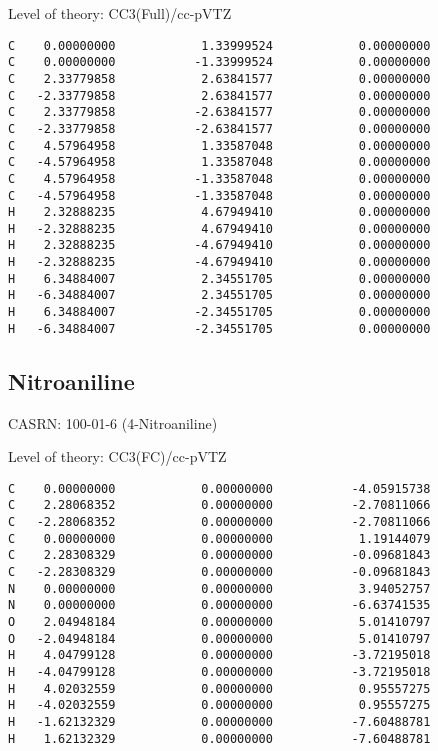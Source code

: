 \documentclass[journal=jctcce,manuscript=article,layout=traditional]{achemso}
\newcommand{\TZ}{cc-pVTZ}
\begin{document}
\begin{singlespace}
\noindent   Level of theory: CC3(Full)/{\TZ}
\begin{verbatim}
C    0.00000000            1.33999524            0.00000000
C    0.00000000           -1.33999524            0.00000000
C    2.33779858            2.63841577            0.00000000
C   -2.33779858            2.63841577            0.00000000
C    2.33779858           -2.63841577            0.00000000
C   -2.33779858           -2.63841577            0.00000000
C    4.57964958            1.33587048            0.00000000
C   -4.57964958            1.33587048            0.00000000
C    4.57964958           -1.33587048            0.00000000
C   -4.57964958           -1.33587048            0.00000000
H    2.32888235            4.67949410            0.00000000
H   -2.32888235            4.67949410            0.00000000
H    2.32888235           -4.67949410            0.00000000
H   -2.32888235           -4.67949410            0.00000000
H    6.34884007            2.34551705            0.00000000
H   -6.34884007            2.34551705            0.00000000
H    6.34884007           -2.34551705            0.00000000
H   -6.34884007           -2.34551705            0.00000000
\end{verbatim}
\end{singlespace}

\subsection{Nitroaniline}

CASRN: 100-01-6 (4-Nitroaniline)

\begin{singlespace}
\noindent   Level of theory: CC3(FC)/{\TZ}
\begin{verbatim}
C    0.00000000            0.00000000           -4.05915738
C    2.28068352            0.00000000           -2.70811066
C   -2.28068352            0.00000000           -2.70811066
C    0.00000000            0.00000000            1.19144079
C    2.28308329            0.00000000           -0.09681843
C   -2.28308329            0.00000000           -0.09681843
N    0.00000000            0.00000000            3.94052757
N    0.00000000            0.00000000           -6.63741535
O    2.04948184            0.00000000            5.01410797
O   -2.04948184            0.00000000            5.01410797
H    4.04799128            0.00000000           -3.72195018
H   -4.04799128            0.00000000           -3.72195018
H    4.02032559            0.00000000            0.95557275
H   -4.02032559            0.00000000            0.95557275
H   -1.62132329            0.00000000           -7.60488781
H    1.62132329            0.00000000           -7.60488781
\end{verbatim}
\end{singlespace}
\end{document}
